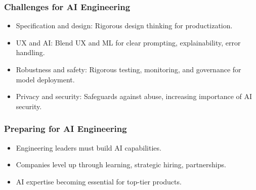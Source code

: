 \begin{frame}[fragile]\frametitle{Challenges for AI Engineering}
\begin{itemize}
    \item Specification and design: Rigorous design thinking for productization.
    \item UX and AI: Blend UX and ML for clear prompting, explainability, error handling.
    \item Robustness and safety: Rigorous testing, monitoring, and governance for model deployment.
    \item Privacy and security: Safeguards against abuse, increasing importance of AI security.
\end{itemize}
\end{frame}

\begin{frame}[fragile]\frametitle{Preparing for AI Engineering}
\begin{itemize}
    \item Engineering leaders must build AI capabilities.
    \item Companies level up through learning, strategic hiring, partnerships.
    \item AI expertise becoming essential for top-tier products.
\end{itemize}
\end{frame}





